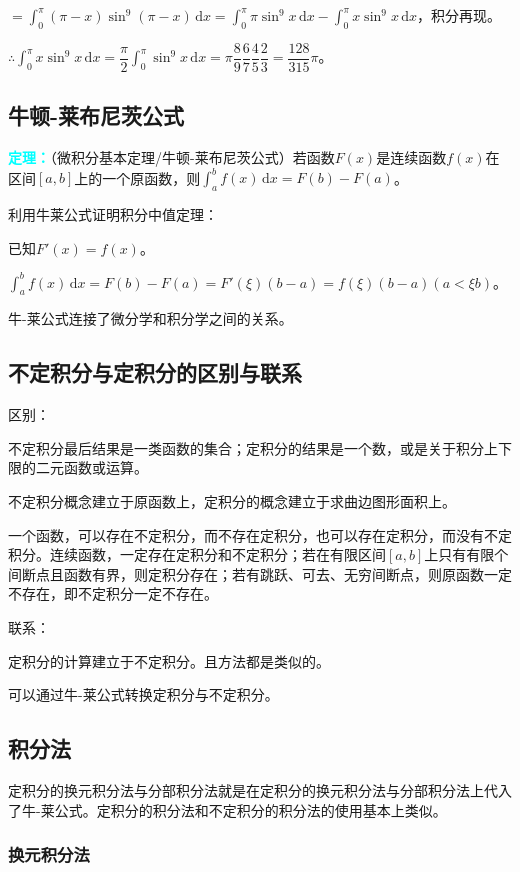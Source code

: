 \documentclass[UTF8, 12pt]{ctexart}
\begin{document}
$=\int_0^\pi(\pi-x)\sin^9(\pi-x)\,\textrm{d}x=\int_0^\pi\pi\sin^9x\,\textrm{d}x-\int_0^\pi x\sin^9x\,\textrm{d}x$，积分再现。

$\therefore\int_0^\pi x\sin^9x\,\textrm{d}x=\dfrac{\pi}{2}\int_0^\pi\sin^9x\,\textrm{d}x=\pi\dfrac{8}{9}\dfrac{6}{7}\dfrac{4}{5}\dfrac{2}{3}=\dfrac{128}{315}\pi$。

\subsection{牛顿-莱布尼茨公式}

\textcolor{aqua}{\textbf{定理：}}（微积分基本定理/牛顿-莱布尼茨公式）若函数$F(x)$是连续函数$f(x)$在区间$[a,b]$上的一个原函数，则$\int_a^bf(x)\,\textrm{d}x=F(b)-F(a)$。

利用牛莱公式证明积分中值定理：

已知$F'(x)=f(x)$。

$\int_a^bf(x)\,\textrm{d}x=F(b)-F(a)=F'(\xi)(b-a)=f(\xi)(b-a)(a<\xi b)$。

牛-莱公式连接了微分学和积分学之间的关系。

\subsection{不定积分与定积分的区别与联系}

区别：

不定积分最后结果是一类函数的集合；定积分的结果是一个数，或是关于积分上下限的二元函数或运算。

不定积分概念建立于原函数上，定积分的概念建立于求曲边图形面积上。

一个函数，可以存在不定积分，而不存在定积分，也可以存在定积分，而没有不定积分。连续函数，一定存在定积分和不定积分；若在有限区间$[a,b]$上只有有限个间断点且函数有界，则定积分存在；若有跳跃、可去、无穷间断点，则原函数一定不存在，即不定积分一定不存在。

联系：

定积分的计算建立于不定积分。且方法都是类似的。

可以通过牛-莱公式转换定积分与不定积分。

\subsection{积分法}

定积分的换元积分法与分部积分法就是在定积分的换元积分法与分部积分法上代入了牛-莱公式。定积分的积分法和不定积分的积分法的使用基本上类似。

\subsubsection{换元积分法}
\end{document}
